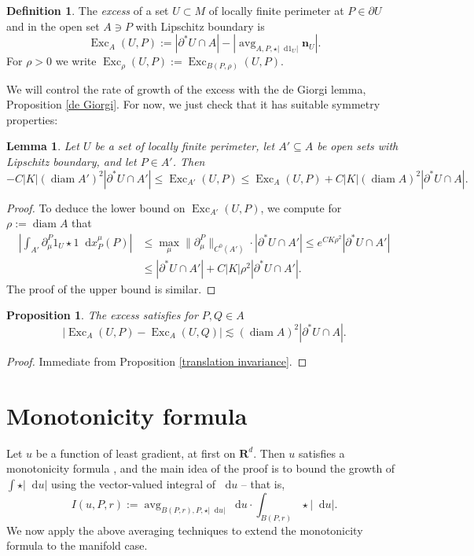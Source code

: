 \documentclass[reqno,11pt]{amsart}
\newcommand{\RR}{\mathbf{R}}
\DeclareMathOperator{\avg}{avg}
\DeclareMathOperator{\diam}{diam}
\DeclareMathOperator{\Exc}{Exc}
\newcommand*\dif{\mathop{}\!\mathrm{d}}
\newcommand{\normal}{\mathbf n}
\newcommand{\dfn}[1]{\emph{#1}\index{#1}}
\newtheorem{lemma}[theorem]{Lemma}
\newtheorem{proposition}[theorem]{Proposition}
\theoremstyle{definition}
\newtheorem{definition}[theorem]{Definition}
\numberwithin{equation}{section}
\begin{document}
\begin{definition}
The \dfn{excess} of a set $U \subset M$ of locally finite perimeter at $P \in \partial U$ and in the open set $A \ni P$ with Lipschitz boundary is
$$\Exc_A(U, P) := |\partial^* U \cap A| - \left|\avg_{A, P, \star |\dif 1_U|} \normal_U\right|.$$
For $\rho > 0$ we write $\Exc_\rho(U, P) := \Exc_{B(P, \rho)}(U, P)$.
\end{definition}

We will control the rate of growth of the excess with the de Giorgi lemma, Proposition \ref{de Giorgi}.
For now, we just check that it has suitable symmetry properties:

\begin{lemma}
Let $U$ be a set of locally finite perimeter, let $A' \subseteq A$ be open sets with Lipschitz boundary, and let $P \in A'$. Then
\begin{equation}\label{approximate monotone}
-C |K| (\diam A')^2 |\partial^* U \cap A'| \leq \Exc_{A'}(U, P) \leq \Exc_A(U, P) + C |K|(\diam A)^2 |\partial^* U \cap A|.
\end{equation}
\end{lemma}
\begin{proof}
To deduce the lower bound on $\Exc_{A'}(U, P)$, we compute for $\rho := \diam A$ that
\begin{align*}
    \left|\int_{A'} \partial^P_\mu 1_U \star 1 \dif x_P^\mu(P)\right|
 & \leq \max_\mu \|\partial^P_\mu\|_{C^0(A')} \cdot |\partial^* U \cap A'| \leq e^{CK\rho^2} |\partial^* U \cap A'| \\
 & \leq |\partial^* U \cap A'| + C|K|\rho^2 |\partial^* U \cap A'|.
\end{align*}
The proof of the upper bound is similar.
\end{proof}

\begin{proposition}\label{translation invariance excess}
The excess satisfies for $P, Q \in A$
$$|\Exc_A(U, P) - \Exc_A(U, Q)| \lesssim (\diam A)^2 |\partial^* U \cap A|.$$
\end{proposition}
\begin{proof}
Immediate from Proposition \ref{translation invariance}.
\end{proof}


\section{Monotonicity formula}\label{MollifierSection}
Let $u$ be a function of least gradient, at first on $\RR^d$.
Then $u$ satisfies a monotonicity formula \cite[Theorem 5.12]{Giusti77}, and the main idea of the proof is to bound the growth of $\int \star |\dif u|$ using the vector-valued integral of $\dif u$ -- that is,
\begin{equation}\label{integral of du}
I(u, P, r) := \avg_{B(P, r), P, \star |\dif u|} \dif u \cdot \int_{B(P, r)} \star |\dif u|.
\end{equation}
We now apply the above averaging techniques to extend the monotonicity formula to the manifold case.
\end{document}
